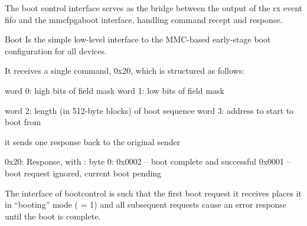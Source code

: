 The boot control interface serves as the bridge between the output of
the rx event fifo and the mmcfpgaboot interface, handling command
recept and response.

Boot Is the simple low-level interface to the MMC-based early-stage
boot configuration for all devices. 

It receives a single command, 0x20, which is structured as follows: 

word 0: high bits of field mask
word 1: low bits of field mask

word 2: length (in 512-byte blocks) of boot sequence
word 3: address to start to boot from

it sends one response back to the original sender


0x20: Response, with : 
   byte 0: 0x0002 -- boot complete and successful
	   0x0001 -- boot request ignored, current boot pending


           The interface of bootcontrol is such that the first boot
           request it receives places it in ``booting'' mode
           ( = 1) and all subsequent requests cause an
           error response until the boot is complete.

